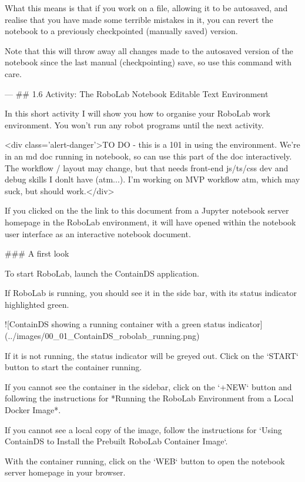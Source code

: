 \documentclass[letterpaper,10pt,english]{sphinxmanual}
\begin{document}
What this means is that if you work on a file, allowing it to be autosaved, and realise that you have made some terrible mistakes in it, you can revert the notebook to a previously checkpointed (manually saved) version.

Note that this will throw away all changes made to the autosaved version of the notebook since the last manual (checkpointing) save, so use this command with care.



---
## 1.6 Activity: The RoboLab Notebook Editable Text Environment


In this short activity I will show you how to organise your RoboLab work environment. You won’t run any robot programs until the next activity.

<div class='alert-danger'>TO DO - this is a 101 in using the environment. We're in an md doc running in notebook, so can use this part of the doc interactively. The workflow / layout may change, but that needs front-end js/ts/css dev and debug skills I donlt have (atm...). I'm working on MVP workflow atm, which may suck, but should work.</div>


If you clicked on the the link to this document from a Jupyter notebook server homepage in the RoboLab environment, it will have opened within the notebook user interface as an interactive notebook document.


### A first look

To start RoboLab, launch the ContainDS application.

If RoboLab is running, you should see it in the side bar, with its status indicator highlighted green.

![ContainDS showing a running container with a green status indicator](../images/00_01_ContainDS_robolab_running.png)

If it is not running, the status indicator will be greyed out. Click on the `START` button to start the container running.

If you cannot see the container in the sidebar, click on the `+NEW` button and following the instructions for *Running the RoboLab Environment from a Local Docker Image*.

If you cannot see a local copy of the image, follow the instructions for `Using ContainDS to Install the Prebuilt RoboLab Container Image`.

With the container running, click on the `WEB` button to open the notebook server homepage in your browser.
\end{document}
